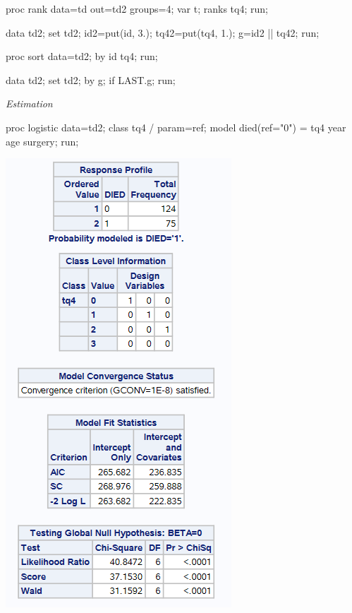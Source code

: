 \documentclass[
  12pt,
  letterpaper,
  DIV=11,
  numbers=noendperiod,
  onepage,
  openany]{scrreprt}
\newenvironment{Shaded}{\begin{snugshade}}{\end{snugshade}}
\newcommand{\AttributeTok}[1]{\textcolor[rgb]{0.80,0.80,0.80}{#1}}
\newcommand{\ControlFlowTok}[1]{\textcolor[rgb]{0.94,0.87,0.69}{#1}}
\newcommand{\DecValTok}[1]{\textcolor[rgb]{0.86,0.86,0.80}{#1}}
\newcommand{\FloatTok}[1]{\textcolor[rgb]{0.75,0.75,0.82}{#1}}
\newcommand{\FunctionTok}[1]{\textcolor[rgb]{0.94,0.94,0.56}{#1}}
\newcommand{\NormalTok}[1]{\textcolor[rgb]{0.80,0.80,0.80}{#1}}
\newcommand{\OtherTok}[1]{\textcolor[rgb]{0.94,0.94,0.56}{#1}}
\newcommand{\SpecialCharTok}[1]{\textcolor[rgb]{0.86,0.64,0.64}{#1}}
\newcommand{\StringTok}[1]{\textcolor[rgb]{0.80,0.58,0.58}{#1}}
\begin{document}
\begin{Shaded}
\begin{Highlighting}[]
\NormalTok{proc rank data}\OtherTok{=}\NormalTok{td out}\OtherTok{=}\NormalTok{td2 groups}\OtherTok{=}\DecValTok{4}\NormalTok{;}
\NormalTok{var t;}
\NormalTok{ranks tq4;}
\NormalTok{run;}

\NormalTok{data td2; set td2;}
\NormalTok{id2}\OtherTok{=}\FunctionTok{put}\NormalTok{(id, }\FloatTok{3.}\NormalTok{);}
\NormalTok{tq42}\OtherTok{=}\FunctionTok{put}\NormalTok{(tq4, }\FloatTok{1.}\NormalTok{);}
\NormalTok{g}\OtherTok{=}\NormalTok{id2 }\SpecialCharTok{||}\NormalTok{ tq42; run;}

\NormalTok{proc sort data}\OtherTok{=}\NormalTok{td2; by id tq4; run;}

\NormalTok{data td2; set td2;}
\NormalTok{by g;}
\ControlFlowTok{if}\NormalTok{ LAST.g; run;}
\end{Highlighting}
\end{Shaded}

\emph{Estimation}

\begin{Shaded}
\begin{Highlighting}[]
\NormalTok{proc logistic data}\OtherTok{=}\NormalTok{td2;}
\NormalTok{class tq4 }\SpecialCharTok{/}\NormalTok{ param}\OtherTok{=}\NormalTok{ref;}
\NormalTok{model }\FunctionTok{died}\NormalTok{(}\AttributeTok{ref=}\StringTok{"0"}\NormalTok{) }\OtherTok{=}\NormalTok{ tq4 year age surgery; run;}
\end{Highlighting}
\end{Shaded}

\includegraphics{sas/7c.PNG}
\end{document}
